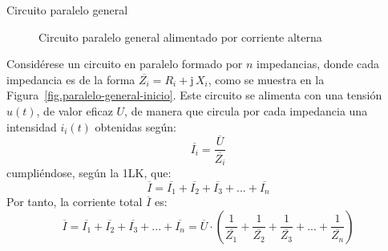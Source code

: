\documentclass[11pt]{book} %
\makeatletter
\numberwithin{dummy}{section}
\theoremstyle{ocrenumbox}
\theoremstyle{blacknumex}
\theoremstyle{blacknumbox}
\theoremstyle{ocrenum}
\renewcommand{\subsection}{\@startsection {subsection}{2}{\z@}
{-3ex \@plus -0.1ex \@minus -.4ex}
{0.5ex \@plus.2ex }
{\normalfont\sffamily\bfseries}}
\makeatother
\begin{document}
	\subsection{Circuito paralelo general}
	\begin{figure}[tbp]
		\centering
		\hfil
		\caption{Circuito paralelo general alimentado por corriente alterna}
		\label{fig.paralelo-general}
	\end{figure}
	Considérese un circuito en paralelo formado por $n$ impedancias, donde cada impedancia es de la forma $\overline{Z_i}=R_i+\mathrm{j}\,X_i$, como se muestra en la Figura~\ref{fig.paralelo-general-inicio}. Este circuito se alimenta con una tensión $u(t)$, de valor eficaz $U$, de manera que circula por cada impedancia una intensidad $i_i(t)$ obtenidas según: 
	\begin{equation*}
		\overline{I_i}=\dfrac{\overline{U}}{\overline{Z_i}}
	\end{equation*}
	cumpliéndose, según la 1LK, que:
	\begin{equation*}
		\overline{I}=\overline{I_1}+\overline{I_2}+\overline{I_3}+...+\overline{I_n}
	\end{equation*}
	Por tanto, la corriente total $\overline{I}$ es:
	\begin{equation*}
		\overline{I}=\overline{I_1}+\overline{I_2}+\overline{I_3}+...+\overline{I_n}=\overline{U} \cdot\left(\dfrac{1}{\overline{Z_1}}+\dfrac{1}{\overline{Z_2}}+\dfrac{1}{\overline{Z_3}}+...+\dfrac{1}{\overline{Z_n}}\right)
	\end{equation*}
\end{document}
